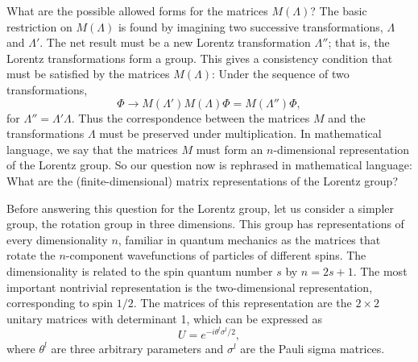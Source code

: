 What are the possible allowed forms for the matrices $M(\Lambda)$?  The basic
restriction on $M(\Lambda)$ is found by imagining two successive
transformations, $\Lambda$ and $\Lambda'$.  The net result must be a new
Lorentz transformation $\Lambda''$; that is, the Lorentz transformations form
a group.  This gives a consistency condition that must be satisfied by the
matrices $M(\Lambda)$: Under the sequence of two transformations,
\begin{equation}
  \Phi \to M(\Lambda')M(\Lambda)\Phi = M(\Lambda'')\Phi,
  \label{eq:3.10}
\end{equation}
for $\Lambda'' = \Lambda'\Lambda$.  Thus the correspondence between the
matrices $M$ and the transformations $\Lambda$ must be preserved under
multiplication.  In mathematical language, we say that the matrices $M$ must
form an $n$-dimensional representation of the Lorentz group.  So our
question now is rephrased in mathematical language: What are the
(finite-dimensional) matrix representations of the Lorentz group?

Before answering this question for the Lorentz group, let us consider a
simpler group, the rotation group in three dimensions.  This group has
representations of every dimensionality $n$, familiar in quantum mechanics
as the matrices that rotate the $n$-component wavefunctions of particles of
different spins.  The dimensionality is related to the spin quantum number
$s$ by $n = 2s+1$.  The most important nontrivial representation is the
two-dimensional representation, corresponding to spin $1/2$.  The matrices of
this representation are the $2\times2$ unitary matrices with determinant 1,
which can be expressed as
\begin{equation}
  U = e^{-i\theta^l\sigma^l/2},
  \label{eq:3.11}
\end{equation}
where $\theta^l$ are three arbitrary parameters and $\sigma^l$ are the Pauli
sigma matrices.

